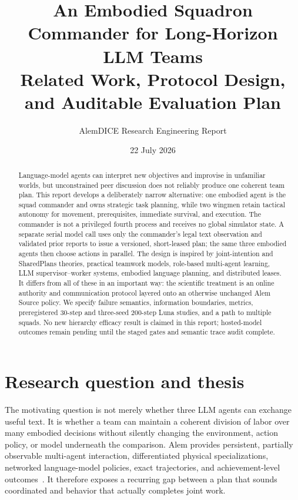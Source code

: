 \documentclass[11pt]{article}
\title{An Embodied Squadron Commander for Long-Horizon LLM Teams\\
Related Work, Protocol Design, and Auditable Evaluation Plan}
\author{AlemDICE Research Engineering Report}
\date{22 July 2026}
\begin{document}
\maketitle

\begin{abstract}
Language-model agents can interpret new objectives and improvise in unfamiliar
worlds, but unconstrained peer discussion does not reliably produce one coherent
team plan.  This report develops a deliberately narrow alternative: one embodied
agent is the squad commander and owns strategic task planning, while two wingmen
retain tactical autonomy for movement, prerequisites, immediate survival, and
execution.  The commander is not a privileged fourth process and receives no
global simulator state.  A separate serial model call uses only the commander's
legal text observation and validated prior reports to issue a versioned,
short-leased plan; the same three embodied agents then choose actions in parallel.
The design is inspired by joint-intention and SharedPlans theories, practical
teamwork models, role-based multi-agent learning, LLM supervisor--worker systems,
embodied language planning, and distributed leases.  It differs from all of
these in an important way: the scientific treatment is an online authority and
communication protocol layered onto an otherwise unchanged Alem Source policy.
We specify failure semantics, information boundaries, metrics, preregistered
30-step and three-seed 200-step Luna studies, and a path to multiple squads.  No
new hierarchy efficacy result is claimed in this report; hosted-model outcomes
remain pending until the staged gates and semantic trace audit complete.
\end{abstract}

\section{Research question and thesis}

The motivating question is not merely whether three LLM agents can exchange
useful text.  It is whether a team can maintain a coherent division of labor over
many embodied decisions without silently changing the environment, action policy,
or model underneath the comparison.  Alem provides persistent, partially
observable multi-agent interaction, differentiated physical specializations,
networked language-model policies, exact trajectories, and achievement-level
outcomes~\citep{alem2026}.  It therefore exposes a recurring gap between a plan
that sounds coordinated and behavior that actually completes joint work.
\end{document}
